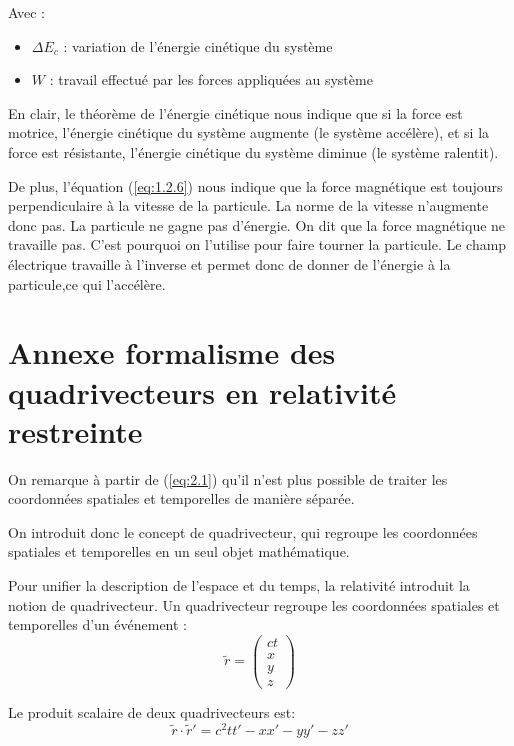 \documentclass[14pt]{article}
\begin{document}
Avec :
\begin{itemize}
    \item $\Delta E_c$ : variation de l'énergie cinétique du système
    \item $W$ : travail effectué par les forces appliquées au système
\end{itemize}

En clair, le théorème de l'énergie cinétique nous indique que si la force est motrice, l'énergie cinétique du système augmente (le système accélère), et si la force est résistante, l'énergie cinétique du système diminue (le système ralentit).

De plus, l'équation (\ref{eq:1.2.6}) nous indique que la force magnétique est toujours perpendiculaire à la vitesse de la particule. La norme de la vitesse n'augmente donc pas. La particule ne gagne pas d'énergie. On dit que la force magnétique ne travaille pas. C'est pourquoi on l'utilise pour faire tourner la particule. Le champ électrique travaille à l'inverse et permet donc de donner de l'énergie à la particule,ce qui l'accélère.


\section{Annexe formalisme des quadrivecteurs en relativité restreinte}


On remarque à partir de (\ref{eq:2.1}) qu'il n'est plus possible de traiter les coordonnées spatiales et temporelles de manière séparée.

On introduit donc le concept de quadrivecteur, qui regroupe les coordonnées spatiales et temporelles en un seul objet mathématique.

Pour unifier la description de l'espace et du temps, la relativité introduit la notion de quadrivecteur. Un quadrivecteur regroupe les coordonnées spatiales et temporelles d'un événement :
\begin{equation}\label{eq:4.1}
    \tilde{r} = \begin{pmatrix}
        ct \\
        x \\
        y \\
        z
    \end{pmatrix}
    \tag{4.1}
\end{equation}

Le produit scalaire de deux quadrivecteurs est:
\begin{equation}\label{eq:4.1.1}
    \tilde{r} \cdot \tilde{r}' = c^2 t t' - x x' - y y' - z z'
    \tag{4.1.1}
\end{equation}
\end{document}
